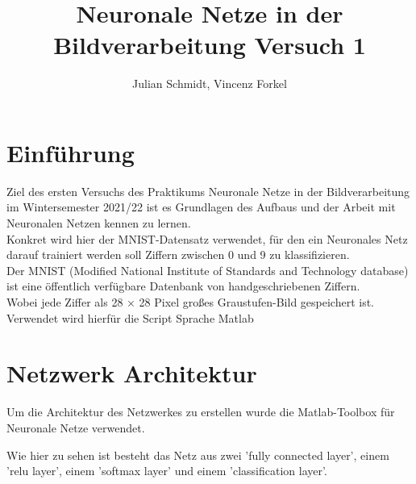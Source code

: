 \documentclass[10pt,a4paper]{article}
\title{Neuronale Netze in der Bildverarbeitung Versuch 1}
\author{Julian Schmidt, Vincenz Forkel}
\begin{document}
\maketitle

\section{Einführung}
Ziel des ersten Versuchs des Praktikums Neuronale Netze in der Bildverarbeitung im Wintersemester 2021/22 ist es Grundlagen des Aufbaus und der Arbeit mit Neuronalen Netzen kennen zu lernen.\\
Konkret wird hier der MNIST-Datensatz verwendet, für den ein Neuronales Netz darauf trainiert werden soll Ziffern zwischen 0 und 9 zu klassifizieren.\\

Der MNIST (Modified National Institute of Standards and Technology database) ist eine öffentlich verfügbare Datenbank von handgeschriebenen Ziffern.\\
Wobei jede Ziffer als 28 × 28 Pixel großes Graustufen-Bild gespeichert ist.\\

Verwendet wird hierfür die Script Sprache Matlab
\newpage
\section{Netzwerk Architektur}
Um die Architektur des Netzwerkes zu erstellen wurde die Matlab-Toolbox für Neuronale Netze verwendet.



Wie hier zu sehen ist besteht das Netz aus zwei 'fully connected layer', einem 'relu layer', einem 'softmax layer' und einem 'classification layer'.
\end{document}
